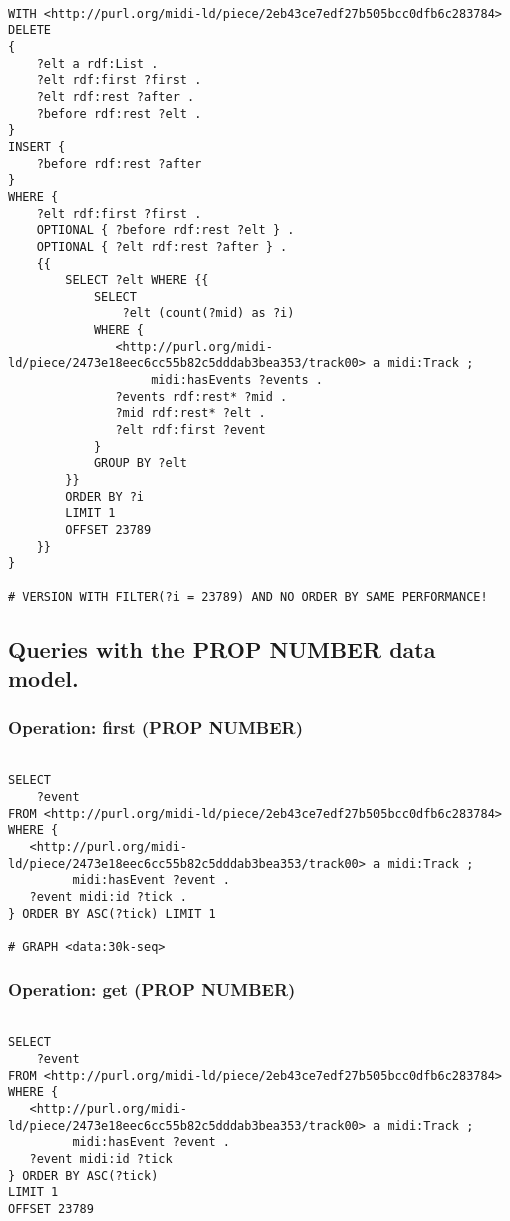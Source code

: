 \begin{lstlisting}[language=sparql]

WITH <http://purl.org/midi-ld/piece/2eb43ce7edf27b505bcc0dfb6c283784>
DELETE
{
  	?elt a rdf:List .
	?elt rdf:first ?first .
	?elt rdf:rest ?after .
	?before rdf:rest ?elt . 
}
INSERT {
	?before rdf:rest ?after
}
WHERE {
	?elt rdf:first ?first .
	OPTIONAL { ?before rdf:rest ?elt } .
	OPTIONAL { ?elt rdf:rest ?after } .
	{{
		SELECT ?elt WHERE {{
			SELECT
				?elt (count(?mid) as ?i)
			WHERE {
			   <http://purl.org/midi-ld/piece/2473e18eec6cc55b82c5dddab3bea353/track00> a midi:Track ;
			        midi:hasEvents ?events .
			   ?events rdf:rest* ?mid .
			   ?mid rdf:rest* ?elt .
			   ?elt rdf:first ?event
			} 
			GROUP BY ?elt
		}}
		ORDER BY ?i
		LIMIT 1
		OFFSET 23789
	}}
}

# VERSION WITH FILTER(?i = 23789) AND NO ORDER BY SAME PERFORMANCE!

\end{lstlisting}


\subsection{Queries with the PROP NUMBER data model.}
\label{queries:PROP-NUMBER}

\subsubsection{Operation: first (PROP NUMBER)}
\label{query:PROP\-NUMBER:first}

\begin{lstlisting}[language=sparql]

SELECT
	?event
FROM <http://purl.org/midi-ld/piece/2eb43ce7edf27b505bcc0dfb6c283784>
WHERE {
   <http://purl.org/midi-ld/piece/2473e18eec6cc55b82c5dddab3bea353/track00> a midi:Track ;
         midi:hasEvent ?event .
   ?event midi:id ?tick .
} ORDER BY ASC(?tick) LIMIT 1

# GRAPH <data:30k-seq>

\end{lstlisting}

\subsubsection{Operation: get (PROP NUMBER)}
\label{query:PROP\-NUMBER:get}

\begin{lstlisting}[language=sparql]

SELECT
	?event
FROM <http://purl.org/midi-ld/piece/2eb43ce7edf27b505bcc0dfb6c283784>
WHERE {
   <http://purl.org/midi-ld/piece/2473e18eec6cc55b82c5dddab3bea353/track00> a midi:Track ;
         midi:hasEvent ?event .
   ?event midi:id ?tick
} ORDER BY ASC(?tick)
LIMIT 1
OFFSET 23789

\end{lstlisting}

